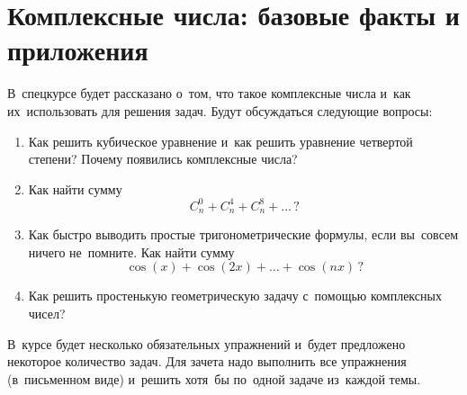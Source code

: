 
\section*{Комплексные числа: базовые факты и приложения}



В~спецкурсе будет рассказано о~том, что такое комплексные числа и~как
их~использовать для решения задач.
Будут обсуждаться следующие вопросы:

\begin{enumerate}

\item
Как решить кубическое уравнение и~как решить уравнение четвертой степени?
Почему появились комплексные числа?

\item
Как найти сумму
\[
    C_n^0 + C_n^4 + C_n^8 + \ldots
\,?\]

\item
Как быстро выводить простые тригонометрические формулы, если вы~совсем ничего
не~помните.
Как найти сумму
\[
    \cos(x) + \cos(2 x) + \ldots + \cos(n x)
\,?\]

\item
Как решить простенькую геометрическую задачу с~помощью комплексных чисел?

\end{enumerate}

В~курсе будет несколько обязательных упражнений и~будет предложено некоторое
количество задач.
Для зачета надо выполнить все упражнения (в~письменном виде) и~решить хотя~бы
по~одной задаче из~каждой темы.

